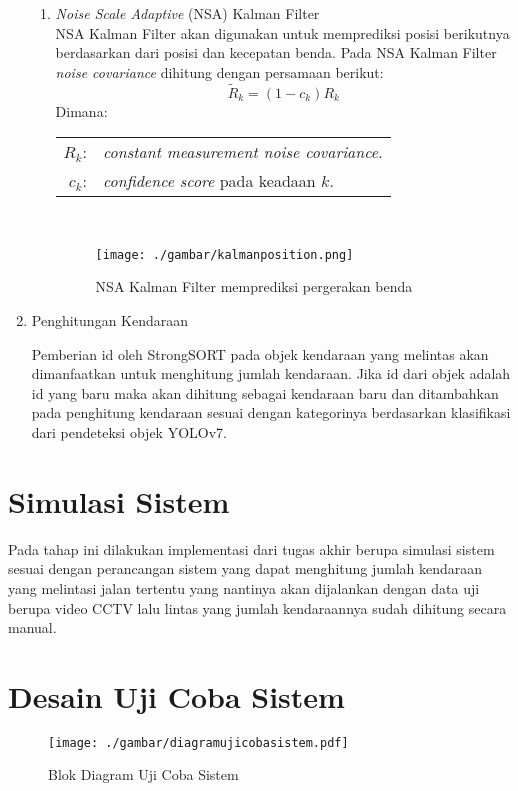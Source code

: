 \begin{enumerate}
\begin{enumerate}
\item{\emph{Noise Scale Adaptive} (NSA) Kalman Filter}\\
NSA Kalman Filter akan digunakan untuk memprediksi posisi berikutnya berdasarkan dari posisi dan kecepatan benda. Pada NSA Kalman Filter \emph{noise covariance} dihitung dengan persamaan berikut:
\begin{equation}
\tilde{R}_k=\left(1-c_k\right) R_k
\end{equation}
Dimana:\\
\hspace*{3em}
\begin{tabular}{rl}
    ${R}_k$:& \emph{constant measurement noise covariance}. \\
    $ c_k$:& \emph{confidence score} pada keadaan $k$. \\
\end{tabular}
\\
\begin{figure}[H]
  \centering
  \texttt{[image: ./gambar/kalmanposition.png]}
  \caption{NSA Kalman Filter memprediksi pergerakan benda}
  \label{fig:IoUequation}
\end{figure}

\end{enumerate}
\item Penghitungan Kendaraan

Pemberian id oleh StrongSORT pada objek kendaraan yang melintas akan dimanfaatkan untuk menghitung jumlah kendaraan. Jika id dari objek adalah id yang baru maka akan dihitung sebagai kendaraan baru dan ditambahkan pada penghitung kendaraan sesuai dengan kategorinya berdasarkan klasifikasi dari pendeteksi objek YOLOv7.

\end{enumerate}
\section{Simulasi Sistem}
Pada tahap ini dilakukan implementasi dari tugas akhir berupa simulasi sistem sesuai dengan perancangan sistem yang dapat menghitung jumlah kendaraan yang melintasi jalan tertentu yang nantinya akan dijalankan dengan data uji berupa video CCTV lalu lintas yang jumlah kendaraannya sudah dihitung secara manual.
\newpage
\section{Desain Uji Coba Sistem}
\begin{figure}[H]
	\centering
	\texttt{[image: ./gambar/diagramujicobasistem.pdf]}
	\caption{Blok Diagram Uji Coba Sistem}
	\label{fig:diagramujicobasistem}
\end{figure}

